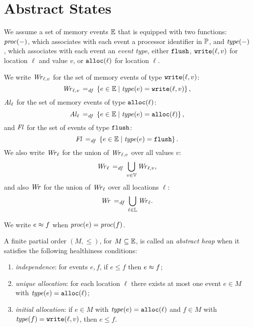 \documentclass[11pt]{report}
\begin{document}
\section{Abstract States}

We assume a set of memory events $\mathbb{E}$ that is equipped with two functions: $\mathit{proc}(-)$, which associates with each event a processor identifier in $\mathbb{P}$, and $\mathit{type}(-)$, which associates with each event an \emph{event type}, either $\mathtt{flush}$, $\mathtt{write}(\ell,v)$ for location $\ell$ and value $v$, or $\mathtt{alloc}(\ell)$ for location $\ell$. 

We write $\mathit{Wr}_{\ell,v}$ for the set of memory events of type $\mathtt{write}(\ell,v)$: \[ \mathit{Wr}_{\ell,v} \operatorname{\;=_{\mathit{df}}\;} \left\lbrace e \in \mathbb{E} \mid \mathit{type}(e) = \mathtt{write}(\ell,v) \right\rbrace,\] $\mathit{Al}_{\ell}$ for the set of memory events of type $\mathtt{alloc}(\ell)$: \[ \mathit{Al}_{\ell} \operatorname{\;=_{\mathit{df}}\;} \left\lbrace e \in \mathbb{E} \mid \mathit{type}(e) = \mathtt{alloc}(\ell) \right\rbrace,\] and $\mathit{Fl}$ for the set of events of type $\mathtt{flush}$: \[ \mathit{Fl} \operatorname{\;=_{\mathit{df}}\;} \left\lbrace e \in \mathbb{E} \mid \mathit{type}(e) = \mathtt{flush} \right\rbrace.\] We also write $\mathit{Wr}_{\ell}$ for the union of $\mathit{Wr}_{\ell,v}$ over all values $v$: \[ \mathit{Wr}_{\ell} \operatorname{\;=_{\mathit{df}}\;} \bigcup_{v \in \mathbb{V}} \mathit{Wr}_{\ell,v},\] and also $\mathit{Wr}$ for the union of $\mathit{Wr}_{\ell}$ over all locations $\ell$: \[ \mathit{Wr} \operatorname{\;=_{\mathit{df}}\;} \bigcup_{\ell \in \mathbb{L}} \mathit{Wr}_{\ell}.\] 

We write $e \approx f$ when $\mathit{proc}(e) = \mathit{proc}(f)$. 

A finite partial order $(M,\leq)$, for $M \subseteq \mathbb{E}$, is called an \emph{abstract heap} when it satisfies the following healthiness conditions: 
\begin{enumerate}
	\item \emph{independence}: for events $e,f$, if $e \leq f$ then $e \approx f$;
	\item \emph{unique allocation}: for each location $\ell$ there exists at most one event $e \in M$ with $\mathit{type}(e) = \mathtt{alloc}(\ell)$;
	\item \emph{initial allocation}: if $e \in M$ with $\mathit{type}(e) = \mathtt{alloc}(\ell)$ and $f \in M$ with $\mathit{type}(f) = \mathtt{write}(\ell,v)$, then $e \leq f$.
\end{enumerate}
\end{document}
